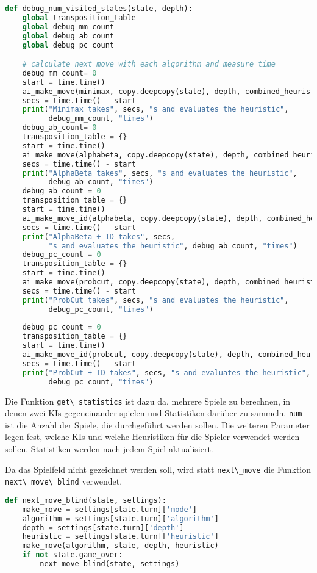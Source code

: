 \begin{lstlisting}[language=Python]
def debug_num_visited_states(state, depth):
    global transposition_table
    global debug_mm_count
    global debug_ab_count
    global debug_pc_count

    # calculate next move with each algorithm and measure time
    debug_mm_count= 0
    start = time.time()
    ai_make_move(minimax, copy.deepcopy(state), depth, combined_heuristic)
    secs = time.time() - start
    print("Minimax takes", secs, "s and evaluates the heuristic",
          debug_mm_count, "times")
    debug_ab_count= 0
    transposition_table = {}
    start = time.time()
    ai_make_move(alphabeta, copy.deepcopy(state), depth, combined_heuristic)
    secs = time.time() - start
    print("AlphaBeta takes", secs, "s and evaluates the heuristic",
          debug_ab_count, "times")
    debug_ab_count = 0
    transposition_table = {}
    start = time.time()
    ai_make_move_id(alphabeta, copy.deepcopy(state), depth, combined_heuristic)
    secs = time.time() - start
    print("AlphaBeta + ID takes", secs,
          "s and evaluates the heuristic", debug_ab_count, "times")
    debug_pc_count = 0
    transposition_table = {}
    start = time.time()
    ai_make_move(probcut, copy.deepcopy(state), depth, combined_heuristic)
    secs = time.time() - start
    print("ProbCut takes", secs, "s and evaluates the heuristic",
          debug_pc_count, "times")
    
    debug_pc_count = 0
    transposition_table = {}
    start = time.time()
    ai_make_move_id(probcut, copy.deepcopy(state), depth, combined_heuristic)
    secs = time.time() - start
    print("ProbCut + ID takes", secs, "s and evaluates the heuristic",
          debug_pc_count, "times")
\end{lstlisting}

Die Funktion \passthrough{\lstinline!get\_statistics!} ist dazu da,
mehrere Spiele zu berechnen, in denen zwei KIs gegeneinander spielen und
Statistiken darüber zu sammeln. \passthrough{\lstinline!num!} ist die
Anzahl der Spiele, die durchgeführt werden sollen. Die weiteren
Parameter legen fest, welche KIs und welche Heuristiken für die Spieler
verwendet werden sollen. Statistiken werden nach jedem Spiel
aktualisiert.

Da das Spielfeld nicht gezeichnet werden soll, wird statt
\passthrough{\lstinline!next\_move!} die Funktion
\passthrough{\lstinline!next\_move\_blind!} verwendet.

\begin{lstlisting}[language=Python]
def next_move_blind(state, settings):
    make_move = settings[state.turn]['mode']
    algorithm = settings[state.turn]['algorithm']
    depth = settings[state.turn]['depth']
    heuristic = settings[state.turn]['heuristic']
    make_move(algorithm, state, depth, heuristic)
    if not state.game_over:
        next_move_blind(state, settings)
\end{lstlisting}


